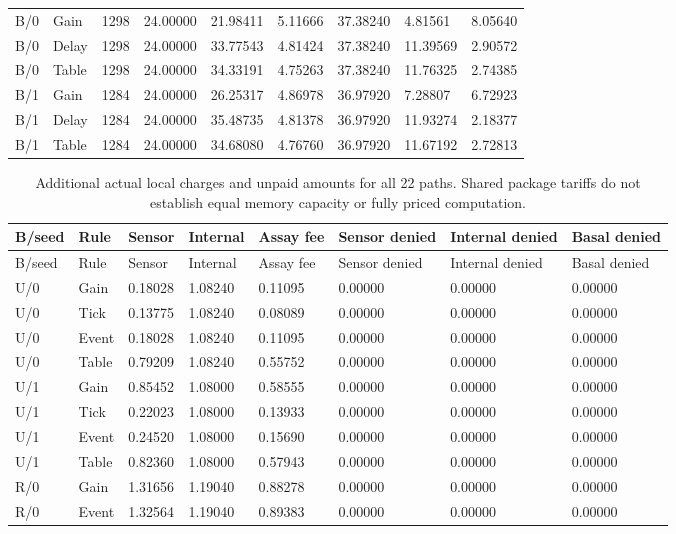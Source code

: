 \begin{longtable}{lllllllll}
B/0 & Gain & 1298 & 24.00000 & 21.98411 & 5.11666 & 37.38240 & 4.81561 & 8.05640 \\
B/0 & Delay & 1298 & 24.00000 & 33.77543 & 4.81424 & 37.38240 & 11.39569 & 2.90572 \\
B/0 & Table & 1298 & 24.00000 & 34.33191 & 4.75263 & 37.38240 & 11.76325 & 2.74385 \\
B/1 & Gain & 1284 & 24.00000 & 26.25317 & 4.86978 & 36.97920 & 7.28807 & 6.72923 \\
B/1 & Delay & 1284 & 24.00000 & 35.48735 & 4.81378 & 36.97920 & 11.93274 & 2.18377 \\
B/1 & Table & 1284 & 24.00000 & 34.68080 & 4.76760 & 36.97920 & 11.67192 & 2.72813 \\
\bottomrule
\end{longtable}
\begin{longtable}{llllllll}
\caption{Additional actual local charges and unpaid amounts for all 22 paths. Shared package tariffs do not establish equal memory capacity or fully priced computation.}\label{tab:local-history-other-costs}\\
\toprule
B/seed & Rule & Sensor & Internal & Assay fee & Sensor denied & Internal denied & Basal denied \\
\midrule
\endfirsthead
\toprule
B/seed & Rule & Sensor & Internal & Assay fee & Sensor denied & Internal denied & Basal denied \\
\midrule
\endhead
U/0 & Gain & 0.18028 & 1.08240 & 0.11095 & 0.00000 & 0.00000 & 0.00000 \\
U/0 & Tick & 0.13775 & 1.08240 & 0.08089 & 0.00000 & 0.00000 & 0.00000 \\
U/0 & Event & 0.18028 & 1.08240 & 0.11095 & 0.00000 & 0.00000 & 0.00000 \\
U/0 & Table & 0.79209 & 1.08240 & 0.55752 & 0.00000 & 0.00000 & 0.00000 \\
U/1 & Gain & 0.85452 & 1.08000 & 0.58555 & 0.00000 & 0.00000 & 0.00000 \\
U/1 & Tick & 0.22023 & 1.08000 & 0.13933 & 0.00000 & 0.00000 & 0.00000 \\
U/1 & Event & 0.24520 & 1.08000 & 0.15690 & 0.00000 & 0.00000 & 0.00000 \\
U/1 & Table & 0.82360 & 1.08000 & 0.57943 & 0.00000 & 0.00000 & 0.00000 \\
R/0 & Gain & 1.31656 & 1.19040 & 0.88278 & 0.00000 & 0.00000 & 0.00000 \\
R/0 & Event & 1.32564 & 1.19040 & 0.89383 & 0.00000 & 0.00000 & 0.00000 \\

\end{longtable}

